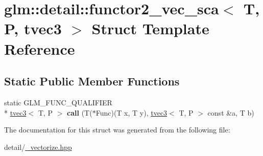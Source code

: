 \hypertarget{structglm_1_1detail_1_1functor2__vec__sca_3_01T_00_01P_00_01tvec3_01_4}{\section{glm\-:\-:detail\-:\-:functor2\-\_\-vec\-\_\-sca$<$ T, P, tvec3 $>$ Struct Template Reference}
\label{structglm_1_1detail_1_1functor2__vec__sca_3_01T_00_01P_00_01tvec3_01_4}
}
\subsection*{Static Public Member Functions}
\begin{DoxyCompactItemize}
\item 
\hypertarget{structglm_1_1detail_1_1functor2__vec__sca_3_01T_00_01P_00_01tvec3_01_4_a9abcc48de3dedce9cbb07d47d520dbc5}{static G\-L\-M\-\_\-\-F\-U\-N\-C\-\_\-\-Q\-U\-A\-L\-I\-F\-I\-E\-R \\*
\hyperlink{structglm_1_1tvec3}{tvec3}$<$ T, P $>$ {\bfseries call} (T($\ast$Func)(T x, T y), \hyperlink{structglm_1_1tvec3}{tvec3}$<$ T, P $>$ const \&a, T b)}\label{structglm_1_1detail_1_1functor2__vec__sca_3_01T_00_01P_00_01tvec3_01_4_a9abcc48de3dedce9cbb07d47d520dbc5}

\end{DoxyCompactItemize}


The documentation for this struct was generated from the following file\-:\begin{DoxyCompactItemize}
\item 
detail/\hyperlink{__vectorize_8hpp}{\-\_\-vectorize.\-hpp}\end{DoxyCompactItemize}
